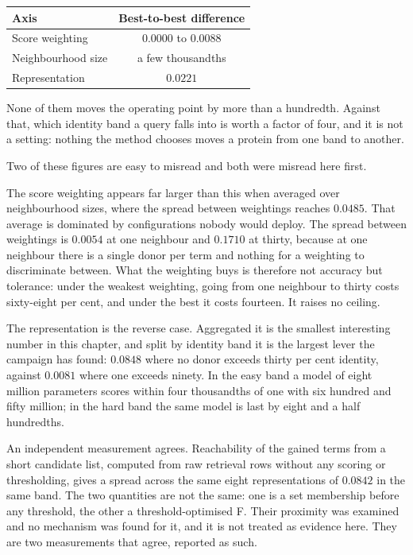 \begin{center}
\begin{tabular}{lc}
\toprule
Axis & Best-to-best difference \\
\midrule
Score weighting     & $0.0000$ to $0.0088$ \\
Neighbourhood size  & a few thousandths \\
Representation      & $0.0221$ \\
\bottomrule
\end{tabular}
\end{center}

None of them moves the operating point by more than a hundredth. Against
that, which identity band a query falls into is worth a factor of four,
and it is not a setting: nothing the method chooses moves a protein from
one band to another.

Two of these figures are easy to misread and both were misread here first.

The score weighting appears far larger than this when averaged over
neighbourhood sizes, where the spread between weightings reaches $0.0485$.
That average is dominated by configurations nobody would deploy. The
spread between weightings is $0.0054$ at one neighbour and $0.1710$ at
thirty, because at one neighbour there is a single donor per term and
nothing for a weighting to discriminate between. What the weighting buys
is therefore not accuracy but tolerance: under the weakest weighting,
going from one neighbour to thirty costs sixty-eight per cent, and under
the best it costs fourteen. It raises no ceiling.

The representation is the reverse case. Aggregated it is the smallest
interesting number in this chapter, and split by identity band it is the
largest lever the campaign has found: $0.0848$ where no donor exceeds
thirty per cent identity, against $0.0081$ where one exceeds ninety. In
the easy band a model of eight million parameters scores within four
thousandths of one with six hundred and fifty million; in the hard band
the same model is last by eight and a half hundredths.

An independent measurement agrees. Reachability of the gained terms from
a short candidate list, computed from raw retrieval rows without any
scoring or thresholding, gives a spread across the same eight
representations of $0.0842$ in the same band. The two quantities are not
the same: one is a set membership before any threshold, the other a
threshold-optimised F. Their proximity was examined and no mechanism was
found for it, and it is not treated as evidence here. They are two
measurements that agree, reported as such.

